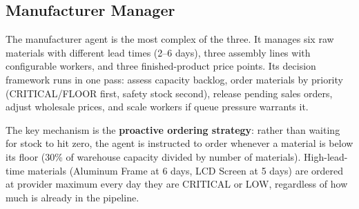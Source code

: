 \documentclass[
]{article}
\begin{document}
\subsection{Manufacturer Manager}\label{manufacturer-manager-skillsmanufacturer-manager.md}

The manufacturer agent is the most complex of the three. It manages six
raw materials with different lead times (2--6 days), three assembly
lines with configurable workers, and three finished-product price
points. Its decision framework runs in one pass: assess capacity
backlog, order materials by priority (CRITICAL/FLOOR first, safety stock
second), release pending sales orders, adjust wholesale prices, and
scale workers if queue pressure warrants it.

The key mechanism is the \textbf{proactive ordering strategy}: rather
than waiting for stock to hit zero, the agent is instructed to order
whenever a material is below its floor (30\% of warehouse capacity
divided by number of materials). High-lead-time materials (Aluminum
Frame at 6 days, LCD Screen at 5 days) are ordered at provider maximum
every day they are CRITICAL or LOW, regardless of how much is already in
the pipeline.
\end{document}
